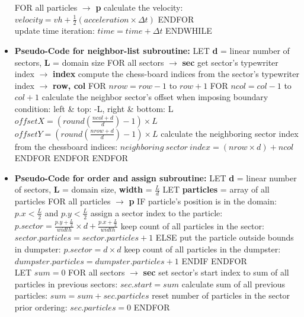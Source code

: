 \documentclass[a4paper,11pt]{article}
\newcommand\tab[1][4mm]{\hspace*{#1}}
\begin{document}
\begin{itemize}
    \tab FOR all particles $\rightarrow$ \textbf{p}
        \tab\tab calculate the velocity: $velocity = vh + \frac{1}{2} (acceleration \times \Delta t)$
    \tab ENDFOR \\

    \tab update time iteration: $time = time + \Delta t$
ENDWHILE
\egroup

\newpage
\item\textbf{Pseudo-Code for neighbor-list subroutine:}
\bgroup\obeylines\small
LET \textbf{d} = linear number of sectors, \textbf{L} = domain size
FOR all sectors $\rightarrow$ \textbf{sec}
    \tab get sector's typewriter index $\rightarrow$ \textbf{index}
    \tab compute the chess-board indices from the sector's typewriter index $\rightarrow$ \textbf{row, col}
    \tab FOR $nrow = row - 1$ to $row + 1$
        \tab\tab FOR $ncol = col - 1$ to $col + 1$
            \tab\tab\tab calculate the neighbor sector's offset when imposing boundary condition:
            \tab\tab\tab\tab left \& top: -L, right \& bottom: L
            \tab\tab\tab\tab $offsetX = (round(\frac{ncol + d}{d}) - 1) \times L$
            \tab\tab\tab\tab $offsetY = (round(\frac{nrow + d}{d}) - 1) \times L$
            \tab\tab\tab calculate the neighboring sector index from the chessboard indices:
            \tab\tab\tab\tab $neighboring \ sector\ index = (nrow \times d) + ncol$
        \tab\tab ENDFOR
    \tab ENDFOR
ENDFOR \\
\egroup

\item\textbf{Pseudo-Code for order and assign subroutine:}
\bgroup\obeylines\small
LET \textbf{d} = linear number of sectors, \textbf{L} = domain size, \textbf{width} = $\frac{L}{d}$
LET \textbf{particles} = array of all particles
FOR all particles $\rightarrow$ \textbf{p}
    \tab IF particle's position is in the domain: $p.x < \frac{L}{2}$ and $p.y < \frac{L}{2}$
        \tab\tab assign a sector index to the particle: $p.sector = \frac{p.y + \frac{L}{2}}{width} \times d + \frac{p.x + \frac{L}{2}}{width}$
        \tab\tab keep count of all particles in the sector: $sector.particles = sector.particles + 1$
    \tab ELSE
        \tab\tab put the particle outside bounds in dumpster: $p.sector = d \times d$
        \tab\tab keep count of all particles in the dumpster: $dumpster.particles = dumpster.particles + 1$
    \tab ENDIF
ENDFOR \\

LET $sum = 0$
FOR all sectors $\rightarrow$ \textbf{sec}
    \tab set sector's start index to sum of all particles in previous sectors: $sec.start = sum$
    \tab calculate sum of all previous particles: $sum = sum + sec.particles$
    \tab reset number of particles in the sector prior ordering: $sec.particles = 0$
ENDFOR \\


\end{itemize}
\end{document}
